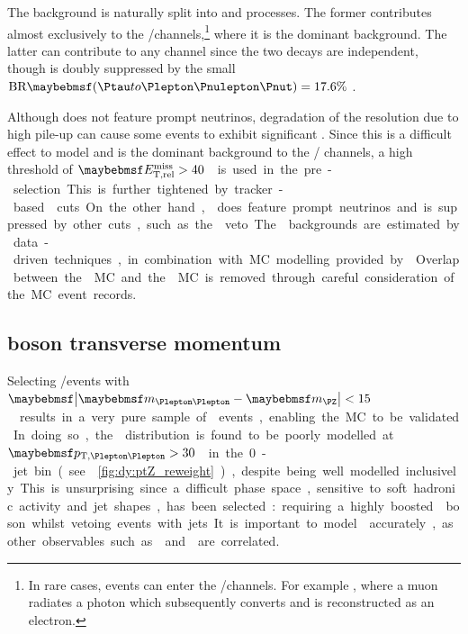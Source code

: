 
The \DY background is naturally split into \DYll and \DYtt processes. The former 
contributes almost exclusively to the \eech/\mmch channels,\footnote{
	In rare cases, \DYll events can enter the \emch/\mech channels. For example 
	\HepProcess{\DY \HepTo \Pmu\Pmu\Pphoton}, where a muon radiates a photon which 
	subsequently converts and is reconstructed as an electron.
}
where it is the dominant background. The latter can contribute to any channel since the 
two \HepProcess{\Ptau \HepTo \Plepton\Pnulepton\Pnut} decays are independent, though is 
doubly suppressed by the small $\text{BR}\parenths{\HepProcess{\Ptau \HepTo 
\Plepton\Pnulepton\Pnut}} = 17.6\%$ \cite{PDG:2012}.

Although \DYll does not feature prompt neutrinos, degradation of the \met resolution due 
to high pile-up can cause some \DYll events to exhibit significant \met. Since this is a 
difficult effect to model and \DYll is the dominant background to the \eech/\mmch 
channels, a high threshold of \unit{$\metrel > 40$}{\GeV} is used in the pre-selection. 
This is further tightened by tracker-based \trackmetrel cuts. On the other hand, \DYtt 
does feature prompt neutrinos and is suppressed by other cuts, such as the \mtautau veto.

The \DY backgrounds are estimated by data-driven techniques, in combination with MC 
modelling provided by \meps{\alpgen}{\fherwig}. Overlap between the \DY MC and the 
\Zgamma MC is removed through careful consideration of the MC event records.



\subsection{\DY boson transverse momentum}
\label{sec:dy:pt}

Selecting \eech/\mmch events with \unit{$\mods{\mll - \mZ} < 15$}{\GeV} results in a very 
pure sample of \DYll events, enabling the MC to be validated. In doing so, the \ptll 
distribution is found to be poorly modelled at \unit{$\ptll > 30$}{\GeV} in the 0-jet 
bin (see \Figure~\ref{fig:dy:ptZ_reweight}), despite being well modelled inclusively. 
This is unsurprising since a difficult phase space, sensitive to soft hadronic activity 
and jet shapes, has been selected: requiring a highly boosted \DY boson whilst vetoing 
events with jets. It is important to model \ptll accurately, as other observables such as 
\dphill and \ptleadlep are correlated.

